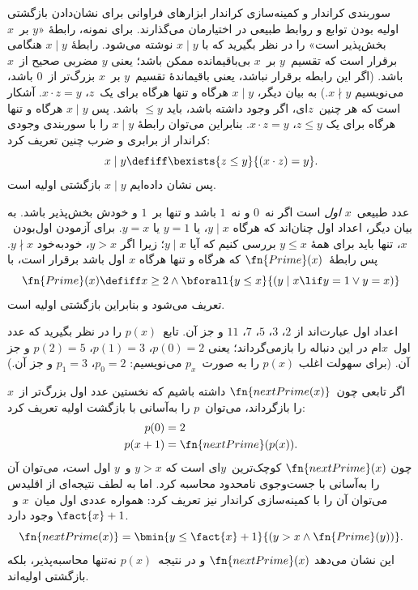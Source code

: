 \documentclass[../../../include/open-logic-section]{subfiles}
\begin{document}

سوربندی کراندار و کمینه‌سازی کراندار ابزارهای فراوانی برای نشان‌دادن
بازگشتی اولیه بودن توابع و روابط طبیعی در اختیارمان می‌گذارند. برای
نمونه، رابطهٔ «$y$ بر~$x$ بخش‌پذیر است» را در نظر بگیرید که با
$x \mid y$ نوشته می‌شود. رابطهٔ $x \mid y$ هنگامی برقرار است که
تقسیم~$y$ بر~$x$ بی‌باقیمانده ممکن باشد؛ یعنی $y$ مضربی صحیح از~$x$
باشد. (اگر این رابطه برقرار نباشد، یعنی باقیماندهٔ تقسیم~$y$ بر~$x$
بزرگ‌تر از~$0$ باشد، می‌نویسیم $x \nmid y$.) به بیان دیگر،
$x \mid y$ هرگاه و تنها هرگاه برای یک~$z$، $x \cdot z = y$. آشکار
است که هر چنین~$z$ای، اگر وجود داشته باشد، باید $\leq y$ باشد. پس
$x \mid y$ هرگاه و تنها هرگاه برای یک $z \le y$،
$x \cdot z = y$. بنابراین می‌توان رابطهٔ $x \mid y$ را با سوربندی
وجودی کراندار از برابری و ضرب چنین تعریف کرد:
\[
x \mid y \defiff \bexists{z \leq y}{(x \cdot z) = y}.
\]
پس نشان داده‌ایم $x \mid y$ بازگشتی اولیه است.

عدد طبیعی~$x$ 
\emph{اول} است اگر نه~$0$ و نه~$1$ باشد و تنها بر~$1$ و خودش
بخش‌پذیر باشد. به بیان دیگر، اعداد اول چنان‌اند که هرگاه
$y \mid x$، یا $y=1$ یا $y=x$. برای آزمودن اول‌بودن~$x$، تنها باید
برای همهٔ $y \le x$ بررسی کنیم که آیا $y \mid x$؛ زیرا اگر $y>x$،
خودبه‌خود $y \nmid x$. پس رابطهٔ~$\fn{Prime}(x)$ که هرگاه و تنها
هرگاه $x$ اول باشد برقرار است، با
\[
\fn{Prime}(x) \defiff x \geq 2 \land \bforall{y \leq x}{(y \mid x \lif y
  = 1 \lor y = x)}
\]
تعریف می‌شود و بنابراین بازگشتی اولیه است.

اعداد اول عبارت‌اند از $2$، $3$، $5$، $7$، $11$ و جز آن. تابع~$p(x)$
را در نظر بگیرید که عدد اول~$x$ام در این دنباله را بازمی‌گرداند؛ یعنی
$p(0)=2$، $p(1)=3$، $p(2)=5$ و جز آن. (برای سهولت اغلب $p(x)$ را
به صورت~$p_x$ می‌نویسیم: $p_0=2$، $p_1=3$ و جز آن.)

اگر تابعی چون~$\fn{nextPrime(x)}$ داشته باشیم که نخستین عدد اول
بزرگ‌تر از~$x$ را بازگرداند، می‌توان~$p$ را به‌آسانی با بازگشت اولیه
تعریف کرد:
\begin{align*}
  p(0) & = 2\\
  p(x+1) & = \fn{nextPrime}(p(x)).
\end{align*}
چون $\fn{nextPrime}(x)$ کوچک‌ترین~$y$ای است که $y>x$ و~$y$ اول است،
می‌توان آن را به‌آسانی با جست‌وجوی نامحدود محاسبه کرد. اما به لطف
نتیجه‌ای از اقلیدس می‌توان آن را با کمینه‌سازی کراندار نیز تعریف کرد:
همواره عددی اول میان~$x$ و~$\fact{x}+1$ وجود دارد.
\[
  \fn{nextPrime(x)} =
  \bmin{y \leq \fact{x}+1}{(y > x \land \fn{Prime}(y))}.
\]
این نشان می‌دهد $\fn{nextPrime}(x)$ و در نتیجه~$p(x)$ نه‌تنها
محاسبه‌پذیر، بلکه بازگشتی اولیه‌اند.
\end{document}
